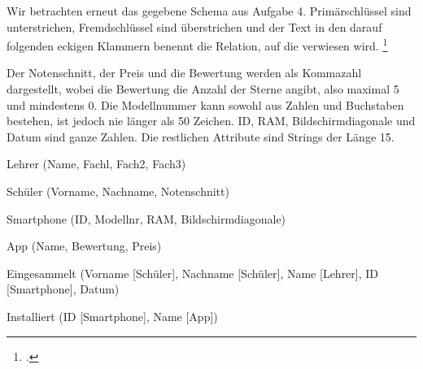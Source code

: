 \documentclass{bschlangaul-aufgabe}
\begin{document}

Wir betrachten erneut das gegebene Schema aus Aufgabe 4. Primärschlüssel
sind unterstrichen, Fremdschlüssel sind überstrichen und der Text in den
darauf folgenden eckigen Klammern benennt die Relation, auf die
verwiesen wird.
\footcite{examen:66116:2019:03}

Der Notenschnitt, der Preis und die Bewertung werden als Kommazahl
dargestellt, wobei die Bewertung die Anzahl der Sterne angibt, also
maximal 5 und mindestens 0. Die Modellnummer kann sowohl aus Zahlen und
Buchstaben bestehen, ist jedoch nie länger als 50 Zeichen. ID, RAM,
Bildschirmdiagonale und Datum sind ganze Zahlen. Die restlichen
Attribute sind Strings der Länge 15.

Lehrer (Name, Fachl, Fach2, Fach3)

Schüler (Vorname, Nachname, Notenschnitt)

Smartphone (ID, Modellnr, RAM, Bildschirmdiagonale)

App (Name, Bewertung, Preis)

Eingesammelt (Vorname [Schüler], Nachname [Schüler], Name [Lehrer], ID [Smartphone], Datum)

Installiert (ID [Smartphone], Name [App])
\end{document}

